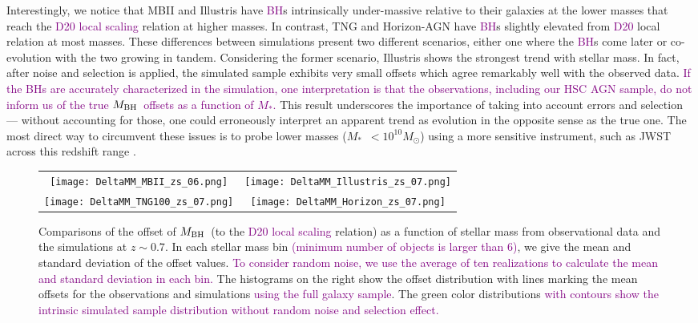 \documentclass[twocolumn]{aastex631}
\newcommand{\todo}[1]{\textcolor{red}{[{\bf TODO}: #1]}}
\newcommand{\red}[1]{\textcolor{purple}{#1}}
\def\smass{{$M_*$}}
\def\mbh{$M_{\rm BH}$}
\begin{document}
Interestingly, we notice that MBII and Illustris have \red{BH}s intrinsically under-massive relative to their galaxies at the lower masses that reach the \red{D20 local scaling} relation at higher masses. In contrast, TNG and Horizon-AGN have \red{BH}s slightly elevated from \red{D20} local relation at most masses. These differences between simulations present two different scenarios, either one where the \red{BH}s come later or co-evolution with the two growing in tandem. Considering the former scenario, Illustris shows the strongest trend with stellar mass. In fact, after noise and selection is applied, the simulated sample exhibits very small offsets which agree remarkably well with the observed data. \red{If the BHs are accurately characterized in the simulation, one interpretation is that the observations, including our HSC AGN sample, do not inform us of the true \mbh\ offsets as a function of \smass.}  This result underscores the importance of taking into account errors and selection --- without accounting for those, one could erroneously interpret an apparent trend as evolution in the opposite sense as the true one. The most direct way to circumvent these issues is to probe lower masses (\smass\  $<10^{10}M_{\odot}$) using a more sensitive instrument, such as JWST~\citep{Habouzit2022} across this redshift range \citep[see also][]{2011MNRAS.417.2085V}.

\begin{figure*}
\centering
\begin{tabular}{c c}
\hspace*{-0.5cm} 
{\texttt{[image: DeltaMM\_MBII\_zs\_06.png]}}&
\hspace*{-0.3cm} 
{\texttt{[image: DeltaMM\_Illustris\_zs\_07.png]}}\\
\hspace*{-0.5cm} 
{\texttt{[image: DeltaMM\_TNG100\_zs\_07.png]}}&
\hspace*{-0.3cm} 
{\texttt{[image: DeltaMM\_Horizon\_zs\_07.png]}}\\
\end{tabular}
\caption{\label{fig:deltaMM} Comparisons of the offset of \mbh\ (to the \red{D20 local scaling} relation) as a function of stellar mass from observational data and the simulations at $z\sim0.7$. In each stellar mass bin \red{(minimum number of objects is larger than 6)}, we give the mean and standard deviation of the offset values. \red{To consider random noise, we use the average of ten realizations to calculate the mean and standard deviation in each bin.} The histograms on the right show the offset distribution with lines marking the mean offsets for the observations and simulations \red{using the full galaxy sample}. The green color distributions \red{with contours show the intrinsic simulated sample distribution without random noise and selection effect.}
}
\end{figure*} 
\end{document}
